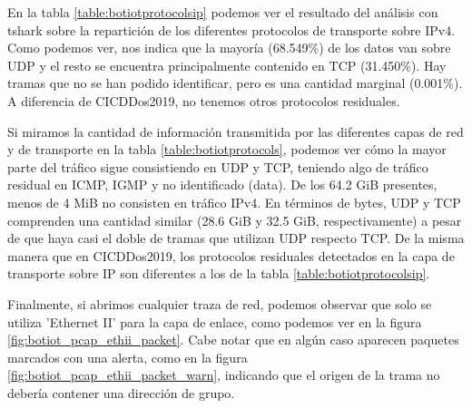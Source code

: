 En la tabla \ref{table:botiotprotocolsip} podemos ver el resultado del análisis con tshark sobre la repartición de los diferentes protocolos de transporte sobre IPv4. Como podemos ver, nos indica que la mayoría (68.549\%) de los datos van sobre UDP y el resto se encuentra principalmente contenido en TCP (31.450\%). Hay tramas que no se han podido identificar, pero es una cantidad marginal (0.001\%). A diferencia de CICDDos2019, no tenemos otros protocolos residuales.



Si miramos la cantidad de información transmitida por las diferentes capas de red y de transporte en la tabla \ref{table:botiotprotocols}, podemos ver cómo la mayor parte del tráfico sigue consistiendo en UDP y TCP, teniendo algo de tráfico residual en ICMP, IGMP y no identificado (data). De los 64.2 GiB presentes, menos de 4 MiB no consisten en tráfico IPv4. En términos de bytes, UDP y TCP comprenden una cantidad similar (28.6 GiB y 32.5 GiB, respectivamente) a pesar de que haya casi el doble de tramas que utilizan UDP respecto TCP. De la misma manera que en CICDDos2019, los protocolos residuales detectados en la capa de transporte sobre IP son diferentes a los de la tabla \ref{table:botiotprotocolsip}.



Finalmente, si abrimos cualquier traza de red, podemos observar que solo se utiliza 'Ethernet II' para la capa de enlace, como podemos ver en la figura \ref{fig:botiot_pcap_ethii_packet}. Cabe notar que en algún caso aparecen paquetes marcados con una alerta, como en la figura \ref{fig:botiot_pcap_ethii_packet_warn}, indicando que el origen de la trama no debería contener una dirección de grupo.

